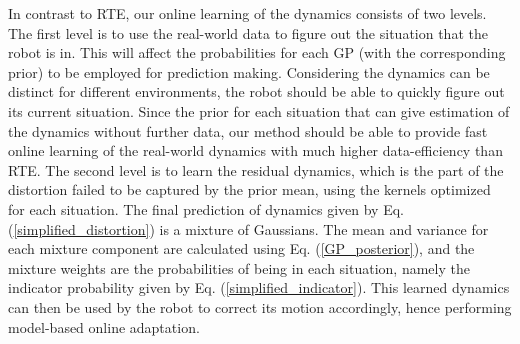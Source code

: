 In contrast to RTE, our online learning of the dynamics consists of two levels.
The first level is to use the real-world data to figure out the situation that the robot is in.
This will affect the probabilities for each GP (with the corresponding prior) to be employed for prediction making.
Considering the dynamics can be distinct for different environments, the robot should be able to quickly figure out its current situation.
Since the prior for each situation that can give estimation of the dynamics without further data, our method should be able to provide fast online learning of the real-world dynamics with much higher data-efficiency than RTE.
The second level is to learn the residual dynamics, which is the part of the distortion failed to be captured by the prior mean, using the kernels optimized for each situation.
The final prediction of dynamics given by Eq. (\ref{simplified_distortion}) is a mixture of Gaussians.
The mean and variance for each mixture component are calculated using Eq. (\ref{GP_posterior}), and the mixture weights are the probabilities of being in each situation, namely the indicator probability given by Eq. (\ref{simplified_indicator}).
This learned dynamics can then be used by the robot to correct its motion accordingly, hence performing model-based online adaptation.



